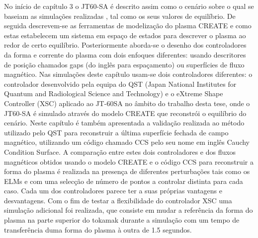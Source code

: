 No início de capítulo 3 o  JT60-SA é descrito assim como o cenário sobre o qual se baseiam as simulações realizadas , tal como os seus valores de equilíbrio. De  seguida descrevem-se as ferramentas de modelização do plasma CREATE e como estas estabelecem um sistema em espaço de estados para descrever o plasma ao redor de certo equilíbrio. Posteriormente aborda-se o desenho dos controladores da forma e corrente do plasma com dois enfoques diferentes: usando descritores de posição chamados gaps (do inglês para espaçamento) ou superfícies de fluxo magnético. Nas simulações deste capítulo usam-se dois controladores diferentes: o controlador desenvolvido pela equipa do QST (Japan National Institutes for Quantum and Radiological Science and Technology) e o eXtreme Shape Controller (XSC) aplicado ao JT-60SA no âmbito do trabalho desta tese, onde o JT60-SA é simulado através do modelo CREATE que reconstrói  o equilíbrio do cenário. Neste capítulo é também apresentada a validação realizada ao método utilizado pelo QST para reconstruir a última superfície fechada de campo magnético, utilizando um código chamado CCS pelo seu nome em inglês Cauchy Condition Surface. A comparação entre estes dois controladores e dos fluxos magnéticos obtidos usando o modelo CREATE e o código CCS para reconstruir a forma do plasma é realizada na presença de diferentes perturbações tais como os ELMs e com uma selecção de número de pontos a controlar distinta para cada caso. Cada um dos controladores parece ter a suas próprias vantagens e desvantagens. Com o fim de testar a flexibilidade do controlador XSC uma simulação adicional foi realizada, que consiste em mudar a  referência da forma do plasma na parte superior do tokamak  durante a simulação com um tempo de transferência duma forma do plasma  à outra de 1.5 segundos. \smallskip

